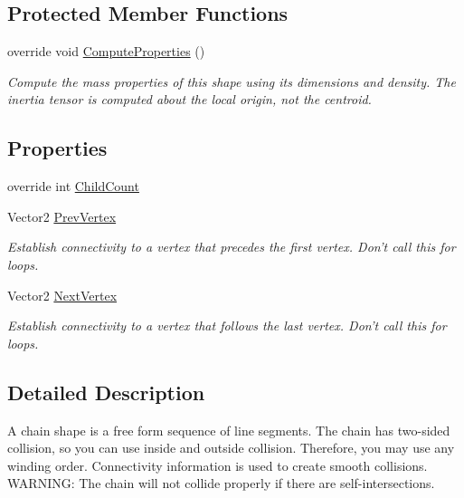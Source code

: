 \subsection*{Protected Member Functions}
\begin{DoxyCompactItemize}
\item 
override void \hyperlink{class_farseer_physics_1_1_collision_1_1_shapes_1_1_chain_shape_ad82757cb99f4c21b84f18b87a25656b6}{Compute\+Properties} ()
\begin{DoxyCompactList}\small\item\em Compute the mass properties of this shape using its dimensions and density. The inertia tensor is computed about the local origin, not the centroid. \end{DoxyCompactList}\end{DoxyCompactItemize}
\subsection*{Properties}
\begin{DoxyCompactItemize}
\item 
override int \hyperlink{class_farseer_physics_1_1_collision_1_1_shapes_1_1_chain_shape_a8a15316b72b32797214108457cfcfee6}{Child\+Count}
\item 
Vector2 \hyperlink{class_farseer_physics_1_1_collision_1_1_shapes_1_1_chain_shape_a201a5e0c8ca5c79ceb9278a16c1bc4e3}{Prev\+Vertex}
\begin{DoxyCompactList}\small\item\em Establish connectivity to a vertex that precedes the first vertex. Don't call this for loops. \end{DoxyCompactList}\item 
Vector2 \hyperlink{class_farseer_physics_1_1_collision_1_1_shapes_1_1_chain_shape_a71a764c759d334dcc27353f804a81dfc}{Next\+Vertex}
\begin{DoxyCompactList}\small\item\em Establish connectivity to a vertex that follows the last vertex. Don't call this for loops. \end{DoxyCompactList}\end{DoxyCompactItemize}


\subsection{Detailed Description}
A chain shape is a free form sequence of line segments. The chain has two-\/sided collision, so you can use inside and outside collision. Therefore, you may use any winding order. Connectivity information is used to create smooth collisions. W\+A\+R\+N\+I\+N\+G\+: The chain will not collide properly if there are self-\/intersections. 



